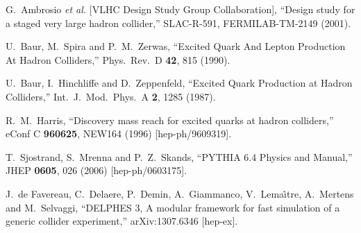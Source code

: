 \begin{thebibliography}{99}

  G.~Ambrosio {\it et al.}  [VLHC Design Study Group Collaboration],
  ``Design study for a staged very large hadron collider,''
  SLAC-R-591, FERMILAB-TM-2149 (2001).

  U.~Baur, M.~Spira and P.~M.~Zerwas,
  ``Excited Quark And Lepton Production At Hadron Colliders,''
  Phys.\ Rev.\ D {\bf 42}, 815 (1990).

  U.~Baur, I.~Hinchliffe and D.~Zeppenfeld,
  ``Excited Quark Production at Hadron Colliders,''
  Int.\ J.\ Mod.\ Phys.\ A {\bf 2}, 1285 (1987).

  R.~M.~Harris,
  ``Discovery mass reach for excited quarks at hadron colliders,''
  eConf C {\bf 960625}, NEW164 (1996)
  [hep-ph/9609319].

  T.~Sjostrand, S.~Mrenna and P.~Z.~Skands,
  ``PYTHIA 6.4 Physics and Manual,''
  JHEP {\bf 0605}, 026 (2006)
  [hep-ph/0603175].

  J.~de Favereau, C.~Delaere, P.~Demin, A.~Giammanco, V.~Lema\^{\i}tre, A.~Mertens and M.~Selvaggi,
  ``DELPHES 3, A modular framework for fast simulation of a generic collider experiment,''
  arXiv:1307.6346 [hep-ex].

\end{thebibliography}


